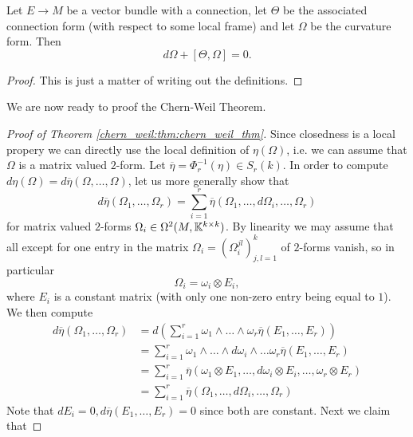 \begin{lemma}
    \label{chern_weil:lem:bianchi_identity}
    Let $E \to M$ be a vector bundle with a connection, let $\Theta$ be the associated connection form (with respect to some local frame) and let $\Omega$ be the curvature form. Then 
    \[
    d \Omega + [\Theta,\Omega] = 0.
    \]
\end{lemma}
\begin{proof}
    This is just a matter of writing out the definitions.
\end{proof}

We are now ready to proof the Chern-Weil Theorem.

\begin{proof}[Proof of Theorem \ref{chern_weil:thm:chern_weil_thm}]
    Since closedness is a local propery we can directly use the local definition of $\eta(\Omega)$, i.e. we can assume that $\Omega$ is a matrix valued $2$-form. Let $\overline{\eta} = \Phi_r^{-1}(\eta) \in S_r(k)$. In order to compute $d \eta(\Omega) = d\overline{\eta}(\Omega,\ldots,\Omega)$, let us more generally show that 
    \begin{equation}
        \label{chern_weil:eq:equation1}
    d \overline{\eta}(\Omega_1,\ldots,\Omega_r) = \sum_{i=1}^{r} \overline{\eta}(\Omega_1,\ldots,d\Omega_i,\ldots,\Omega_r)
    \end{equation}
    for matrix valued $2$-forms $\Omega_i \in \Omega^2(M,\mathbb{K}^{k \times k})$. By linearity we may assume that all except for one entry in the matrix $\Omega_i = (\Omega_i^{jl})_{j,l=1}^k$ of $2$-forms vanish, so in particular
    \[
    \Omega_i = \omega_i \otimes E_i,
    \]
    where $E_i$ is a constant matrix (with only one non-zero entry being equal to $1$). We then compute 
    \begin{align*}
        d \overline{\eta}(\Omega_1,\ldots,\Omega_r) &= d \left(\sum_{i=1}^{r} \omega_1 \wedge \ldots \wedge \omega_r \overline{\eta}(E_1,\ldots,E_r)\right) \\
        &= \sum_{i=1}^{r} \omega_1 \wedge \ldots \wedge d\omega_i \wedge \ldots \omega_r \overline{\eta}(E_1,\ldots,E_r) \\
        &= \sum_{i=1}^{r} \overline{\eta}(\omega_1 \otimes E_1,\ldots, d\omega_i \otimes E_i, \ldots, \omega_r \otimes E_r) \\
        &= \sum_{i=1}^{r} \overline{\eta}(\Omega_1,\ldots,d\Omega_i,\ldots,\Omega_r)
    \end{align*}
    Note that $d E_i = 0, d \overline{\eta}(E_1,\ldots,E_r) = 0$ since both are constant. Next we claim that 

\end{proof}
